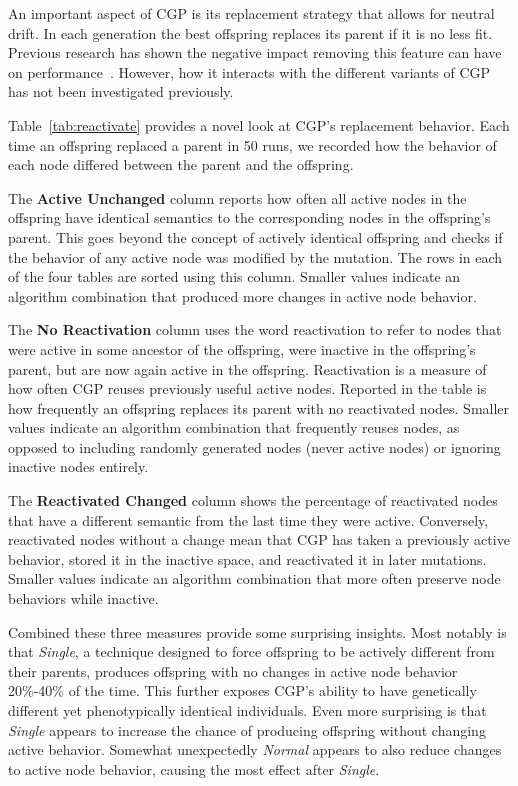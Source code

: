 \documentclass[journal]{IEEEtran}
\begin{document}
An important aspect of CGP is its replacement strategy that allows for neutral drift.
In each generation the best offspring replaces its parent if it is no less fit.  Previous
research has shown the negative impact removing this feature can have on
performance~\cite{yu:2001:neutrality}. However, how it interacts with the different variants
of CGP has not been investigated previously.

Table~\ref{tab:reactivate} provides a
novel look at CGP's replacement behavior.  Each time an offspring replaced a parent
in 50 runs, we recorded how the behavior of each node differed between the
parent and the offspring.

The \textbf{Active Unchanged} column reports how often all active nodes in the offspring
have identical semantics to the corresponding nodes in the offspring's parent.
This goes beyond the concept of actively identical offspring and checks if the behavior
of any active node was modified by the mutation.  The rows in each of the four
tables are sorted using this column.  Smaller values indicate an algorithm
combination that produced more changes in active node behavior.

The \textbf{No Reactivation} column uses the word reactivation to refer to nodes
that were active in some ancestor of the offspring, were inactive in the offspring's
parent, but are now again active in the offspring.  Reactivation is a measure of how
often CGP reuses previously useful active nodes.  Reported in the table is how
frequently an offspring replaces its parent with no reactivated nodes.  Smaller
values indicate an algorithm combination that frequently reuses nodes, as opposed to
including randomly generated nodes (never active nodes) or ignoring inactive nodes
entirely.

The \textbf{Reactivated Changed} column shows the percentage of reactivated nodes
that have a different semantic from the last time they were active.  Conversely,
reactivated nodes without a change mean that CGP has taken a previously active behavior,
stored it in the inactive space, and reactivated it in later mutations.  Smaller values
indicate an algorithm combination that more often preserve node behaviors while
inactive.

Combined these three measures provide some surprising insights.  Most notably
is that \emph{Single}, a technique designed to force offspring to be actively different
from their parents, produces offspring with no changes in active node behavior
20\%-40\% of the time.  This further exposes CGP's ability to have genetically different
yet phenotypically identical individuals.  Even more surprising is that \emph{Single}
appears to increase the chance of producing offspring without changing active behavior.
Somewhat unexpectedly \emph{Normal} appears to also reduce changes to active node behavior,
causing the most effect after \emph{Single}.
\end{document}
